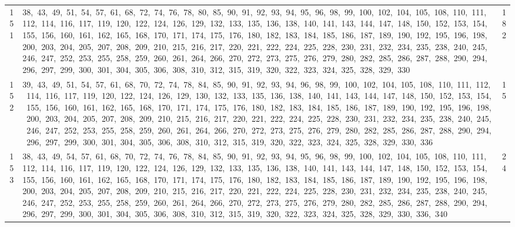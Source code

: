 \begin{longtable}{c|p{}|r}
151 & 38,\ 43,\ 49,\ 51,\ 54,\ 57,\ 61,\ 68,\ 72,\ 74,\ 76,\ 78,\ 80,\ 85,\ 90,\ 91,\ 92,\ 93,\ 94,\ 95,\ 96,\ 98,\ 99,\ 100,\ 102,\ 104,\ 105,\ 108,\ 110,\ 111,\ 112,\ 114,\ 116,\ 117,\ 119,\ 120,\ 122,\ 124,\ 126,\ 129,\ 132,\ 133,\ 135,\ 136,\ 138,\ 140,\ 141,\ 143,\ 144,\ 147,\ 148,\ 150,\ 152,\ 153,\ 154,\ 155,\ 156,\ 160,\ 161,\ 162,\ 165,\ 168,\ 170,\ 171,\ 174,\ 175,\ 176,\ 180,\ 182,\ 183,\ 184,\ 185,\ 186,\ 187,\ 189,\ 190,\ 192,\ 195,\ 196,\ 198,\ 200,\ 203,\ 204,\ 205,\ 207,\ 208,\ 209,\ 210,\ 215,\ 216,\ 217,\ 220,\ 221,\ 222,\ 224,\ 225,\ 228,\ 230,\ 231,\ 232,\ 234,\ 235,\ 238,\ 240,\ 245,\ 246,\ 247,\ 252,\ 253,\ 255,\ 258,\ 259,\ 260,\ 261,\ 264,\ 266,\ 270,\ 272,\ 273,\ 275,\ 276,\ 279,\ 280,\ 282,\ 285,\ 286,\ 287,\ 288,\ 290,\ 294,\ 296,\ 297,\ 299,\ 300,\ 301,\ 304,\ 305,\ 306,\ 308,\ 310,\ 312,\ 315,\ 319,\ 320,\ 322,\ 323,\ 324,\ 325,\ 328,\ 329,\ 330 & 182 \\
152 & 39,\ 43,\ 49,\ 51,\ 54,\ 57,\ 61,\ 68,\ 70,\ 72,\ 74,\ 78,\ 84,\ 85,\ 90,\ 91,\ 92,\ 93,\ 94,\ 96,\ 98,\ 99,\ 100,\ 102,\ 104,\ 105,\ 108,\ 110,\ 111,\ 112,\ 114,\ 116,\ 117,\ 119,\ 120,\ 122,\ 124,\ 126,\ 129,\ 130,\ 132,\ 133,\ 135,\ 136,\ 138,\ 140,\ 141,\ 143,\ 144,\ 147,\ 148,\ 150,\ 152,\ 153,\ 154,\ 155,\ 156,\ 160,\ 161,\ 162,\ 165,\ 168,\ 170,\ 171,\ 174,\ 175,\ 176,\ 180,\ 182,\ 183,\ 184,\ 185,\ 186,\ 187,\ 189,\ 190,\ 192,\ 195,\ 196,\ 198,\ 200,\ 203,\ 204,\ 205,\ 207,\ 208,\ 209,\ 210,\ 215,\ 216,\ 217,\ 220,\ 221,\ 222,\ 224,\ 225,\ 228,\ 230,\ 231,\ 232,\ 234,\ 235,\ 238,\ 240,\ 245,\ 246,\ 247,\ 252,\ 253,\ 255,\ 258,\ 259,\ 260,\ 261,\ 264,\ 266,\ 270,\ 272,\ 273,\ 275,\ 276,\ 279,\ 280,\ 282,\ 285,\ 286,\ 287,\ 288,\ 290,\ 294,\ 296,\ 297,\ 299,\ 300,\ 301,\ 304,\ 305,\ 306,\ 308,\ 310,\ 312,\ 315,\ 319,\ 320,\ 322,\ 323,\ 324,\ 325,\ 328,\ 329,\ 330,\ 336 & 15 \\
153 & 38,\ 43,\ 49,\ 54,\ 57,\ 61,\ 68,\ 70,\ 72,\ 74,\ 76,\ 78,\ 84,\ 85,\ 90,\ 91,\ 92,\ 93,\ 94,\ 95,\ 96,\ 98,\ 99,\ 100,\ 102,\ 104,\ 105,\ 108,\ 110,\ 111,\ 112,\ 114,\ 116,\ 117,\ 119,\ 120,\ 122,\ 124,\ 126,\ 129,\ 132,\ 133,\ 135,\ 136,\ 138,\ 140,\ 141,\ 143,\ 144,\ 147,\ 148,\ 150,\ 152,\ 153,\ 154,\ 155,\ 156,\ 160,\ 161,\ 162,\ 165,\ 168,\ 170,\ 171,\ 174,\ 175,\ 176,\ 180,\ 182,\ 183,\ 184,\ 185,\ 186,\ 187,\ 189,\ 190,\ 192,\ 195,\ 196,\ 198,\ 200,\ 203,\ 204,\ 205,\ 207,\ 208,\ 209,\ 210,\ 215,\ 216,\ 217,\ 220,\ 221,\ 222,\ 224,\ 225,\ 228,\ 230,\ 231,\ 232,\ 234,\ 235,\ 238,\ 240,\ 245,\ 246,\ 247,\ 252,\ 253,\ 255,\ 258,\ 259,\ 260,\ 261,\ 264,\ 266,\ 270,\ 272,\ 273,\ 275,\ 276,\ 279,\ 280,\ 282,\ 285,\ 286,\ 287,\ 288,\ 290,\ 294,\ 296,\ 297,\ 299,\ 300,\ 301,\ 304,\ 305,\ 306,\ 308,\ 310,\ 312,\ 315,\ 319,\ 320,\ 322,\ 323,\ 324,\ 325,\ 328,\ 329,\ 330,\ 336,\ 340 & 24 \\

\end{longtable}
